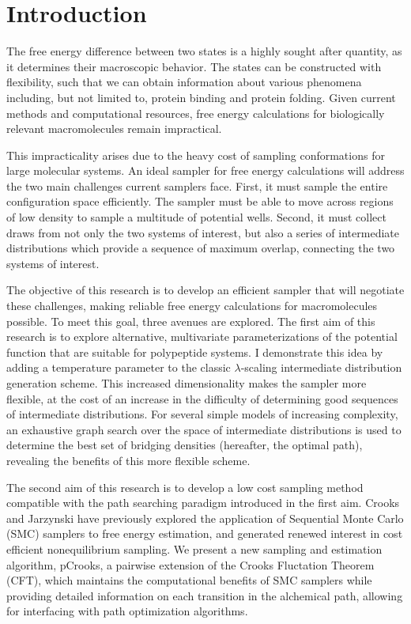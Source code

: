 
\chapter{Introduction}

The free energy difference between two states is a highly sought after quantity, as it determines their macroscopic behavior. The states can be constructed with flexibility, such that we can obtain information about various phenomena including, but not limited to, protein binding and protein folding. Given current methods and computational resources, free energy calculations for biologically relevant macromolecules remain impractical\cite{shirts2007alchemical, pohorille2010good}.

This impracticality arises due to the heavy cost of sampling conformations for large molecular systems. An ideal sampler for free energy calculations will address the two main challenges current samplers face. First, it must sample the entire configuration space efficiently. The sampler must be able to move across regions of low density to sample a multitude of potential wells. Second, it must collect draws from not only the two systems of interest, but also a series of intermediate distributions which provide a sequence of maximum overlap, connecting the two systems of interest.

The objective of this research is to develop an efficient sampler that will negotiate these challenges, making reliable free energy calculations for macromolecules possible. To meet this goal, three avenues are explored. 
The first aim of this research is to explore alternative, multivariate parameterizations of the potential function that are suitable for polypeptide systems. I demonstrate this idea by adding a temperature parameter to the classic $\lambda$-scaling intermediate distribution generation scheme. This increased dimensionality makes the sampler more flexible, at the cost of an increase in the difficulty of determining good sequences of intermediate distributions. For several simple models of increasing complexity, an exhaustive graph search over the space of intermediate distributions is used to determine the best set of bridging densities (hereafter, the optimal path), revealing the benefits of this more flexible scheme. 

The second aim of this research is to develop a low cost sampling method compatible with the path searching paradigm introduced in the first aim.
Crooks\cite{crooks2000path} and Jarzynski\cite{jarzynski1997nonequilibrium1} have previously explored the application of Sequential Monte Carlo (SMC) samplers\cite{del2006sequential, cappe2007overview} to free energy estimation, and generated renewed interest in cost efficient nonequilibrium sampling.
We present a new sampling and estimation algorithm, pCrooks, a pairwise extension of the Crooks Fluctation Theorem (CFT), which maintains the computational benefits of SMC samplers while providing detailed information on each transition in the alchemical path, allowing for interfacing with path optimization algorithms.

